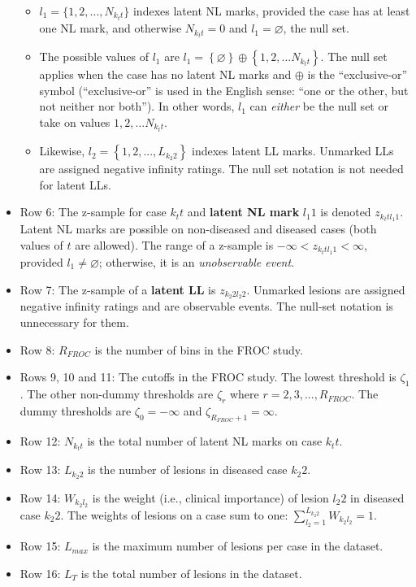 \documentclass[
]{book}
\begin{document}
\begin{itemize}
  \begin{itemize}
  \item
    \(l_1 = \{1, 2, ..., N_{k_t t}\}\) indexes latent NL marks, provided the case has at least one NL mark, and otherwise \(N_{k_t t} = 0\) and \(l_1 = \varnothing\), the null set.
  \item
    The possible values of \(l_1\) are \(l_1 = \left \{ \varnothing \right \}\oplus \left \{ 1,2,...N_{k_t t} \right \}\). The null set applies when the case has no latent NL marks and \(\oplus\) is the ``exclusive-or'' symbol (``exclusive-or'' is used in the English sense: ``one or the other, but not neither nor both''). In other words, \(l_1\) can \emph{either} be the null set or take on values \(1,2,...N_{k_t t}\).
  \item
    Likewise, \(l_2 = \left \{ 1,2,...,L_{k_2 2} \right \}\) indexes latent LL marks. Unmarked LLs are assigned negative infinity ratings. The null set notation is not needed for latent LLs.
  \end{itemize}
\item
  Row 6: The z-sample for case \(k_t t\) and \textbf{latent NL mark} \(l_1 1\) is denoted \(z_{k_t t l_1 1}\). Latent NL marks are possible on non-diseased and diseased cases (both values of \(t\) are allowed). The range of a z-sample is \(-\infty < z_{k_t t l_1 1} < \infty\), provided \(l_1 \neq \varnothing\); otherwise, it is an \emph{unobservable event}.
\item
  Row 7: The z-sample of a \textbf{latent LL} is \(z_{k_2 2 l_2 2}\). Unmarked lesions are assigned negative infinity ratings and are observable events. The null-set notation is unnecessary for them.
\item
  Row 8: \(R_{FROC}\) is the number of bins in the FROC study.
\item
  Rows 9, 10 and 11: The cutoffs in the FROC study. The lowest threshold is \(\zeta_1\). The other non-dummy thresholds are \(\zeta_r\) where \(r=2,3,...,R_{FROC}\). The dummy thresholds are \(\zeta_0 = -\infty\) and \(\zeta_{R_{FROC}+1} = \infty\).
\item
  Row 12: \(N_{k_t t}\) is the total number of latent NL marks on case \(k_t t\).
\item
  Row 13: \(L_{k_2 2}\) is the number of lesions in diseased case \(k_2 2\).
\item
  Row 14: \(W_{k_2 l_2}\) is the weight (i.e., clinical importance) of lesion \(l_2 2\) in diseased case \(k_2 2\). The weights of lesions on a case sum to one: \(\sum_{l_2 = 1}^{L_{k_2 2}}W_{k_2 l_2} = 1\).
\item
  Row 15: \(L_{max}\) is the maximum number of lesions per case in the dataset.
\item
  Row 16: \(L_T\) is the total number of lesions in the dataset.
\end{itemize}
\end{document}
